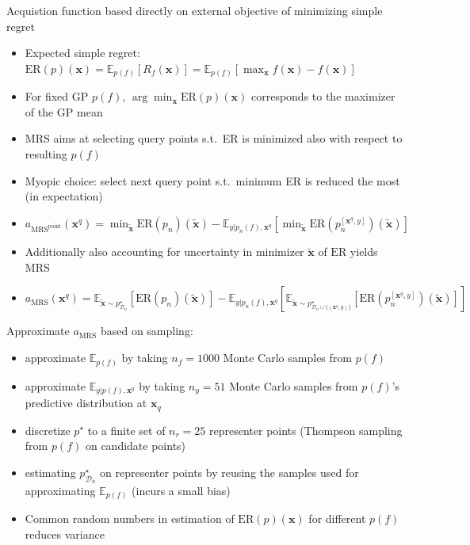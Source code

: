 \begin{block}{}

Acquistion function based directly on external objective of minimizing simple regret
\begin{itemize}
 \item Expected simple regret: $\text{ER}(p)(\mathbf{x}) = \mathbb{E}_{p(f)}[R_f(\mathbf{x})]
= \mathbb{E}_{p(f)}[\max_{\mathbf{x}} f(\mathbf{x}) - f(\mathbf{
x})]$
 \item For fixed GP $p(f)$, $\arg\min_\mathbf{x} \text{ER}(p)(\mathbf{x})$ corresponds to the maximizer of the GP mean
 \item MRS aims at selecting query points s.t.\  ER is minimized also with respect to resulting $p(f)$
 \item Myopic choice: select next query point s.t.\ minimum ER is reduced the most (in expectation)
 \item $a_{\text{MRS}^{\text{point}}}(\mathbf{x}^q)
	= \min_{\mathbf{\tilde x}}\text{ER}(p_n)(\mathbf{\tilde x})
	 - \mathbb{E}_{y \vert p_n(f), \mathbf{x}^q}[\min_{\mathbf{\tilde x}}  \text{ER}(p^{[\mathbf{x}^q, y]}_n)(\mathbf{\tilde x})]$
 \item Additionally also accounting for uncertainty in minimizer $\mathbf{\tilde x}$ of $\text{ER}$ yields MRS
 \item $a_{\text{MRS}}(\mathbf{x}^q)
    = \mathbb{E}_{\mathbf{\tilde x} \sim p^\star_{\mathcal{D}_n}}[\text{ER}(p_n)(\mathbf{\tilde x})] 
	   - \mathbb{E}_{y \vert p_n(f), \mathbf{x}^q}[
		  \mathbb{E}_{\mathbf{\tilde x} \sim p^\star_{\mathcal{D}_n \cup \{(\mathbf{x}^q, y)\}}}[
			 \text{ER}(p^{[\mathbf{x}^q, y]}_n)(\mathbf{\tilde x})]]$
\end{itemize}

Approximate $a_{\text{MRS}}$ based on sampling:
\begin{itemize}
 \item approximate $\mathbb{E}_{p(f)}$ by taking $n_f=1000$ Monte Carlo samples from $p(f)$
 \item approximate $\mathbb{E}_{y \vert p(f), \mathbf{x}^q}$  by taking
$n_y=51$ Monte Carlo samples from $p(f)$'s predictive distribution at
$\mathbf{x}_q$
 \item discretize $p^\star$ to a finite set of $n_r=25$ representer points (Thompson
sampling from $p(f)$ on candidate points)
 \item estimating $p^\star_{\mathcal{D}_n}$ on representer points by reusing the samples used 
for approximating $\mathbb{E}_{p(f)}$ (incurs a small bias)
\item Common random numbers in estimation of
$\text{ER}(p)(\mathbf{x})$ for different $p(f)$ reduces variance
\end{itemize}
\end{block}

